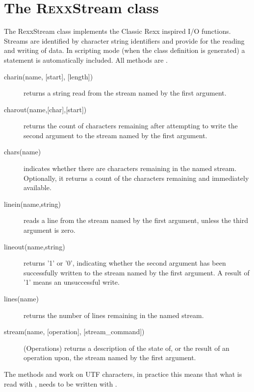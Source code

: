 \section{The R\textsc{exx}Stream class}\label{refrexxstream}

The RexxStream class implements the Classic Rexx inspired I/O
functions. Streams are identified by character string identifiers and
provide for the reading and writing of data. In scripting mode (when
the class definition is generated) a  statement is
automatically included. All methods are .

\begin{description}
  
\item[charin(name, [start{]}, [length{]})] returns a string read from the stream named by the first
argument.

\item[charout(name,[char{]},[start{]})] returns the count of characters remaining after attempting to
write the second argument to the stream named by the first argument.

\item[chars(name)] indicates whether there are characters remaining in the named
stream. Optionally, it returns a count of the characters remaining and
immediately available.

\item[linein(name,string)] reads a line from the stream named by the first argument,
unless the third argument is zero.

\item[lineout(name,string)] returns '1' or '0', indicating whether the second argument has been successfully written to the stream named by the first argument. A result of '1' means an unsuccessful write.

\item[lines(name)] returns the number of lines remaining in the named stream.

\item[stream(name, [operation{]}, [stream\_command{]})] (Operations) returns a description of the state of, or the result of an
operation upon, the stream named by the first argument.

\end{description}

The methods  and  work on UTF
characters, in practice this means that what is read with
, needs to be written with .


